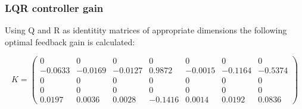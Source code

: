 \subsubsection{LQR controller gain}

Using Q and R as identitity matrices of appropriate dimensions the following optimal feedback gain is calculated:

\begin{equation}
	K = \left(\begin{array}{ccccccc}
		0 & 0 & 0 & 0 & 0 & 0 & 0\\
		-0.0633 & -0.0169 & -0.0127 & 0.9872 & -0.0015 & -0.1164 & -0.5374\\
		0 & 0 & 0 & 0 & 0 & 0 & 0\\
		0 & 0 & 0 & 0 & 0 & 0 & 0\\
		0.0197 & 0.0036 & 0.0028 & -0.1416 & 0.0014 & 0.0192 & 0.0836
	\end{array}\right)
\end{equation}



